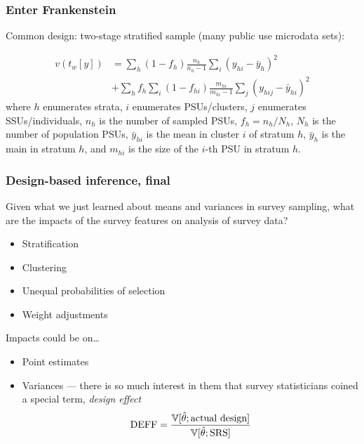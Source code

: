 \documentclass{beamer}
\newcommand{\Var}{\mathbb{V}}
\begin{document}
\begin{frame}\frametitle{Enter Frankenstein}

Common design: two-stage stratified sample (many public use microdata sets):

\begin{align*}
v(t_w[y]) & =
\sum_{h} (1-f_h) \frac{n_h}{n_h-1}
\sum_{i} (y_{hi} - \bar y_h)^2
\\ &
+
\sum_{h} f_h
\sum_{i} (1-f_{hi})\frac{m_{hi}}{m_{hi}-1}
\sum_{j} (y_{hij} - \bar y_{hi})^2
\end{align*}
where $h$ enumerates strata, $i$ enumerates PSUs/clusters, $j$ enumerates SSUs/individuals, $n_h$ is the number of sampled PSUs,
$f_h=n_h/N_h$, $N_h$ is the number of population PSUs, $\bar y_{hi}$ is the mean in cluster $i$ of stratum $h$,
$\bar y_h$ is the main in stratum $h$, and $m_{hi}$ is the size of the $i$-th PSU in stratum $h$.

\end{frame}

\begin{frame}\frametitle{Design-based inference, final}

Given what we just learned about means and variances in survey sampling, what are the impacts of
the survey features on analysis of survey data?

\begin{itemize}
    \item Stratification
    \item Clustering
    \item Unequal probabilities of selection
    \item Weight adjustments
\end{itemize}

Impacts could be on\ldots
\begin{itemize}
    \item Point estimates
    \item Variances --- there is so much interest in them that survey statisticians coined a special term,
        \textit{design effect}
        $$
            {\rm DEFF} = \frac{\Var[\hat\theta; \mbox{actual design}]}{\Var[\hat\theta; \mbox{SRS}]}
        $$
\end{itemize}

\end{frame}
\end{document}

